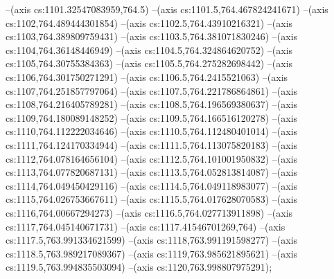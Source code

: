 --(axis cs:1101.32547083959,764.5)
--(axis cs:1101.5,764.467824241671)
--(axis cs:1102,764.489444301854)
--(axis cs:1102.5,764.43910216321)
--(axis cs:1103,764.389809759431)
--(axis cs:1103.5,764.381071830246)
--(axis cs:1104,764.36148446949)
--(axis cs:1104.5,764.324864620752)
--(axis cs:1105,764.30755384363)
--(axis cs:1105.5,764.275282698442)
--(axis cs:1106,764.301750271291)
--(axis cs:1106.5,764.2415521063)
--(axis cs:1107,764.251857797064)
--(axis cs:1107.5,764.221786864861)
--(axis cs:1108,764.216405789281)
--(axis cs:1108.5,764.196569380637)
--(axis cs:1109,764.180089148252)
--(axis cs:1109.5,764.166516120278)
--(axis cs:1110,764.112222034646)
--(axis cs:1110.5,764.112480401014)
--(axis cs:1111,764.124170334944)
--(axis cs:1111.5,764.113075820183)
--(axis cs:1112,764.078164656104)
--(axis cs:1112.5,764.101001950832)
--(axis cs:1113,764.077820687131)
--(axis cs:1113.5,764.052813814087)
--(axis cs:1114,764.049450429116)
--(axis cs:1114.5,764.049118983077)
--(axis cs:1115,764.026753667611)
--(axis cs:1115.5,764.017628070583)
--(axis cs:1116,764.00667294273)
--(axis cs:1116.5,764.027713911898)
--(axis cs:1117,764.045140671731)
--(axis cs:1117.41546701269,764)
--(axis cs:1117.5,763.991334621599)
--(axis cs:1118,763.991191598277)
--(axis cs:1118.5,763.989217089367)
--(axis cs:1119,763.985621895621)
--(axis cs:1119.5,763.994835503094)
--(axis cs:1120,763.998807975291);


